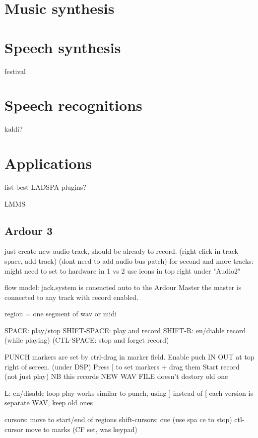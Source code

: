 \documentclass[oneside,english]{scrbook}
\begin{document}
\chapter{Music synthesis}


\chapter{Speech synthesis}

festival


\chapter{Speech recognitions}

kaldi?


\chapter{Applications}

list best LADSPA plugins?

LMMS

\section{Ardour 3}

just create new audio track, should be already to record. 
	(right click in track space, add track)
	(dont need to add audio bus patch) 
	for second and more tracks:
		might need to set to hardware in 1 vs 2
			use icons in top right under "Audio2"

flow model:
	jack,system is conencted auto to the Ardour Master
	the master is connected to any track with record enabled.

region = one segment of wav or midi

SPACE: 		play/stop
SHIFT-SPACE:  	play and record  
SHIFT-R:  	en/diable record (while playing)
(CTL-SPACE: 	stop and forget record)

PUNCH markers are set by ctrl-drag in marker field. 
	Enable puch IN OUT at top right of screen. (under DSP) 
	Press [ to set markers + drag them
	Start record (not just play)
	NB this records NEW WAV FILE doesn't destory old one
 
L: 	en/disable loop play
	works similar to punch, using ] instead of [
	each version is separate WAV, keep old ones	

cursors: 	move to start/end of regions
shift-cursors: 	cue (use spa  ce to stop)
ctl-cursor 	move to marks (CF set, was keypad)
\end{document}
